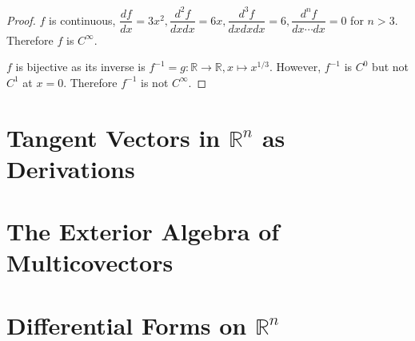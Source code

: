 \begin{proof}
	\( f \) is continuous, \( \dfrac{df}{dx} = 3x^{2}, \dfrac{d^{2}f}{dxdx} = 6x, \dfrac{d^{3}f}{dxdxdx} = 6, \dfrac{d^{n}f}{dx\cdots dx} = 0 \) for \( n > 3 \). Therefore \( f \) is \( C^{\infty} \).

	\( f \) is bijective as its inverse is \( f^{-1} = g: \mathbb{R} \to \mathbb{R}, x \mapsto x^{1/3} \). However, \( f^{-1} \) is \( C^{0} \) but not \( C^{1} \) at \( x = 0 \). Therefore \( f^{-1} \) is not \( C^{\infty} \).
\end{proof}

\section{Tangent Vectors in \( \mathbb{R}^{n} \) as Derivations}

\section{The Exterior Algebra of Multicovectors}

\section{Differential Forms on \( \mathbb{R}^{n} \)}
